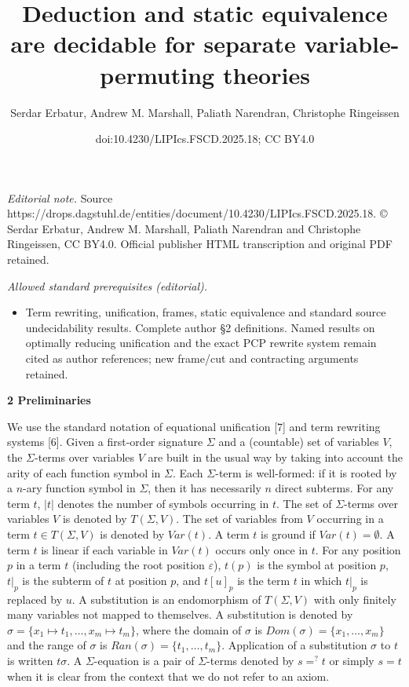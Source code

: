 \documentclass[10pt,a4paper]{amsart}
\title{Deduction and static equivalence are decidable for separate variable-permuting theories}
\author{Serdar Erbatur, Andrew M. Marshall, Paliath Narendran, Christophe Ringeissen}
\date{doi:10.4230/LIPIcs.FSCD.2025.18; CC BY4.0}
\begin{document}
\maketitle
\noindent\textit{Editorial note.} Source https://drops.dagstuhl.de/entities/document/10.4230/LIPIcs.FSCD.2025.18. © Serdar Erbatur, Andrew M. Marshall, Paliath Narendran and Christophe Ringeissen, CC BY4.0. Official publisher HTML transcription and original PDF retained.\par\medskip
\noindent\textit{Allowed standard prerequisites (editorial).}\begin{itemize}
\item Term rewriting, unification, frames, static equivalence and standard source undecidability results. Complete author §2 definitions. Named results on optimally reducing unification and the exact PCP rewrite system remain cited as author references; new frame/cut and contracting arguments retained.
\end{itemize}\medskip
 
\par\medskip\noindent\textbf{2 Preliminaries}\par
 
 
We use the standard notation of equational unification [7] and term rewriting systems [6]. Given a first-order signature $\Sigma$ and a (countable) set of variables $V$, the $\Sigma$-terms over variables $V$ are built in the usual way by taking into account the arity of each function symbol in $\Sigma$. Each $\Sigma$-term is well-formed: if it is rooted by a $n$-ary function symbol in $\Sigma$, then it has necessarily $n$ direct subterms. For any term $t$, $|t|$ denotes the number of symbols occurring in $t$. The set of $\Sigma$-terms over variables $V$ is denoted by $T(\Sigma,V)$. The set of variables from $V$ occurring in a term $t\in T(\Sigma,V)$ is denoted by $\mathit{Var}(t)$. A term $t$ is ground if $\mathit{Var}(t)=\emptyset$. A term $t$ is linear if each variable in $\mathit{Var}(t)$ occurs only once in $t$. For any position $p$ in a term $t$ (including the root position $\varepsilon$), $t(p)$ is the symbol at position $p$, $t|_{p}$ is the subterm of $t$ at position $p$, and $t[u]_{p}$ is the term $t$ in which $t|_{p}$ is replaced by $u$. A substitution is an endomorphism of $T(\Sigma,V)$ with only finitely many variables not mapped to themselves. A substitution is denoted by $\sigma=\{x_{1}\mapsto t_{1},\dots,x_{m}\mapsto t_{m}\}$, where the domain of $\sigma$ is $Dom(\sigma)=\{x_{1},\dots,x_{m}\}$ and the range of $\sigma$ is $Ran(\sigma)=\{t_{1},\dots,t_{m}\}$. Application of a substitution $\sigma$ to $t$ is written $t\sigma$. A $\Sigma$-equation is a pair of $\Sigma$-terms denoted by $s=^{?}t$ or simply $s=t$ when it is clear from the context that we do not refer to an axiom.\par
 
\end{document}
